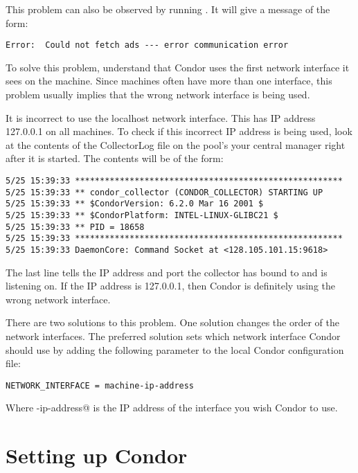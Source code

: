\begin{description}
This problem can also be observed by running .
It will give a message of the form:
\begin{verbatim}
Error:  Could not fetch ads --- error communication error
\end{verbatim}

To solve this problem, understand that
Condor uses the first network interface it sees on the machine.
Since machines often have more than one interface,
this problem usually implies that the wrong network
interface is being used.

It is incorrect to use the localhost network interface.
This has IP address 127.0.0.1 on all machines.
To check if this incorrect IP address is being used,
look at the contents of the
CollectorLog file on the pool's
your central manager right after it is started.  
The contents will be of the form:

\begin{verbatim}
5/25 15:39:33 ******************************************************
5/25 15:39:33 ** condor_collector (CONDOR_COLLECTOR) STARTING UP
5/25 15:39:33 ** $CondorVersion: 6.2.0 Mar 16 2001 $
5/25 15:39:33 ** $CondorPlatform: INTEL-LINUX-GLIBC21 $
5/25 15:39:33 ** PID = 18658
5/25 15:39:33 ******************************************************
5/25 15:39:33 DaemonCore: Command Socket at <128.105.101.15:9618>
\end{verbatim}

The last line tells the IP address and port the collector has
bound to and is listening on.
If the IP address is 127.0.0.1, then Condor is definitely using the wrong
network interface.

There are two solutions to this problem.
One solution changes the order of the network interfaces.
The preferred solution
sets which network interface Condor should use
by adding the following parameter to the
local Condor configuration file:

\begin{verbatim}NETWORK_INTERFACE = machine-ip-address\end{verbatim}

Where \verb@machine-ip-address@ is the IP address of the interface you wish
Condor to use.

\end{description}

\section{Setting up Condor}

